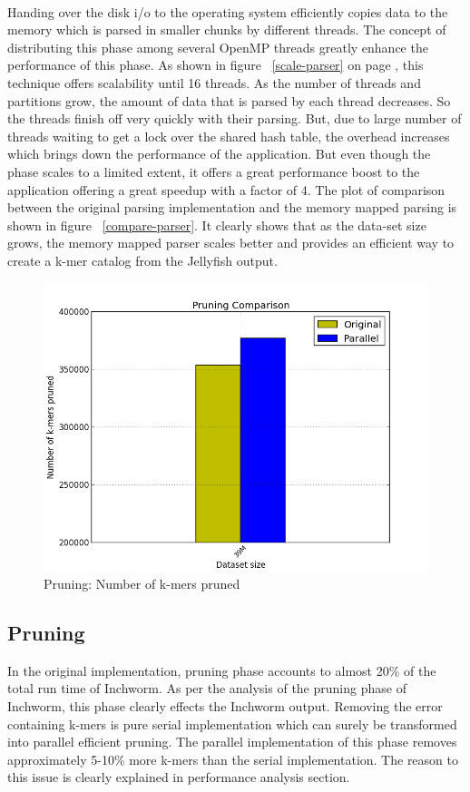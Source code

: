 \label{key}\documentclass[plainarticle, english ,zihtitle,final,hyperref,utf8]{zihpub}
\begin{document}
\paragraph{}
Handing over the disk i/o to the operating system efficiently copies data to the memory which is parsed in smaller chunks by different threads. The concept of distributing this phase among several OpenMP threads greatly enhance the performance of this phase. As shown in figure ~\ref{scale-parser} on page \pageref{scale-parser}, this technique offers scalability until 16 threads. As the number of threads and partitions grow, the amount of data that is parsed by each thread decreases. So the threads finish off very quickly with their parsing. But, due to large number of threads waiting to get a lock over the shared hash table, the overhead increases which brings down the performance of the application. But even though the phase scales to a limited extent, it offers a great performance boost to the application offering a great speedup with a factor of 4. The plot of comparison between the original parsing implementation and the memory mapped parsing is shown in figure ~\ref{compare-parser}. It clearly shows that as the data-set size grows, the memory mapped parser scales better and provides an efficient way to create a k-mer catalog from the Jellyfish output.
\begin{figure}[h]
\center
\includegraphics[scale=0.4]{pruning_compare}
\caption{Pruning: Number of k-mers pruned}
\label{compare-pruningnum}
\end{figure}
\subsection{Pruning}
In the original implementation, pruning phase accounts to almost 20\% of the total run time of Inchworm. As per the analysis of the pruning phase of Inchworm, this phase clearly effects the Inchworm output. Removing the error containing k-mers is pure serial implementation which can surely be transformed into parallel efficient pruning. The parallel implementation of this phase removes approximately 5-10\% more k-mers than the serial implementation. The reason to this issue is clearly explained in performance analysis section. 
\end{document}

